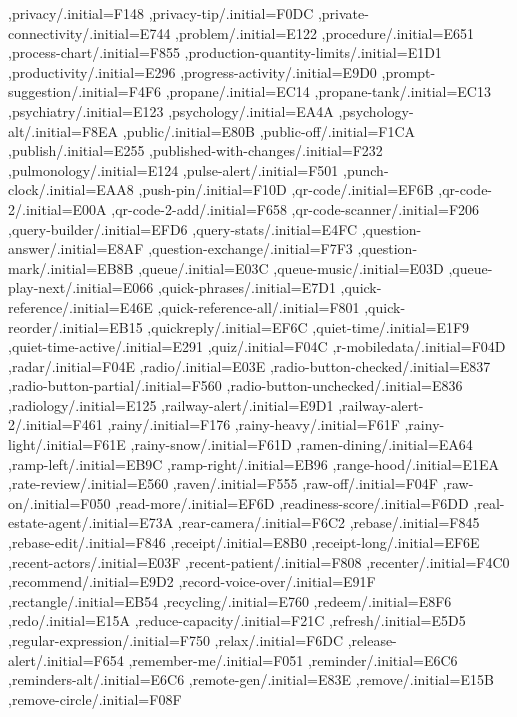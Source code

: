 { ,privacy/.initial=F148
 ,privacy-tip/.initial=F0DC
 ,private-connectivity/.initial=E744
 ,problem/.initial=E122
 ,procedure/.initial=E651
 ,process-chart/.initial=F855
 ,production-quantity-limits/.initial=E1D1
 ,productivity/.initial=E296
 ,progress-activity/.initial=E9D0
 ,prompt-suggestion/.initial=F4F6
 ,propane/.initial=EC14
 ,propane-tank/.initial=EC13
 ,psychiatry/.initial=E123
 ,psychology/.initial=EA4A
 ,psychology-alt/.initial=F8EA
 ,public/.initial=E80B
 ,public-off/.initial=F1CA
 ,publish/.initial=E255
 ,published-with-changes/.initial=F232
 ,pulmonology/.initial=E124
 ,pulse-alert/.initial=F501
 ,punch-clock/.initial=EAA8
 ,push-pin/.initial=F10D
 ,qr-code/.initial=EF6B
 ,qr-code-2/.initial=E00A
 ,qr-code-2-add/.initial=F658
 ,qr-code-scanner/.initial=F206
 ,query-builder/.initial=EFD6
 ,query-stats/.initial=E4FC
 ,question-answer/.initial=E8AF
 ,question-exchange/.initial=F7F3
 ,question-mark/.initial=EB8B
 ,queue/.initial=E03C
 ,queue-music/.initial=E03D
 ,queue-play-next/.initial=E066
 ,quick-phrases/.initial=E7D1
 ,quick-reference/.initial=E46E
 ,quick-reference-all/.initial=F801
 ,quick-reorder/.initial=EB15
 ,quickreply/.initial=EF6C
 ,quiet-time/.initial=E1F9
 ,quiet-time-active/.initial=E291
 ,quiz/.initial=F04C
 ,r-mobiledata/.initial=F04D
 ,radar/.initial=F04E
 ,radio/.initial=E03E
 ,radio-button-checked/.initial=E837
 ,radio-button-partial/.initial=F560
 ,radio-button-unchecked/.initial=E836
 ,radiology/.initial=E125
 ,railway-alert/.initial=E9D1
 ,railway-alert-2/.initial=F461
 ,rainy/.initial=F176
 ,rainy-heavy/.initial=F61F
 ,rainy-light/.initial=F61E
 ,rainy-snow/.initial=F61D
 ,ramen-dining/.initial=EA64
 ,ramp-left/.initial=EB9C
 ,ramp-right/.initial=EB96
 ,range-hood/.initial=E1EA
 ,rate-review/.initial=E560
 ,raven/.initial=F555
 ,raw-off/.initial=F04F
 ,raw-on/.initial=F050
 ,read-more/.initial=EF6D
 ,readiness-score/.initial=F6DD
 ,real-estate-agent/.initial=E73A
 ,rear-camera/.initial=F6C2
 ,rebase/.initial=F845
 ,rebase-edit/.initial=F846
 ,receipt/.initial=E8B0
 ,receipt-long/.initial=EF6E
 ,recent-actors/.initial=E03F
 ,recent-patient/.initial=F808
 ,recenter/.initial=F4C0
 ,recommend/.initial=E9D2
 ,record-voice-over/.initial=E91F
 ,rectangle/.initial=EB54
 ,recycling/.initial=E760
 ,redeem/.initial=E8F6
 ,redo/.initial=E15A
 ,reduce-capacity/.initial=F21C
 ,refresh/.initial=E5D5
 ,regular-expression/.initial=F750
 ,relax/.initial=F6DC
 ,release-alert/.initial=F654
 ,remember-me/.initial=F051
 ,reminder/.initial=E6C6
 ,reminders-alt/.initial=E6C6
 ,remote-gen/.initial=E83E
 ,remove/.initial=E15B
 ,remove-circle/.initial=F08F
}
